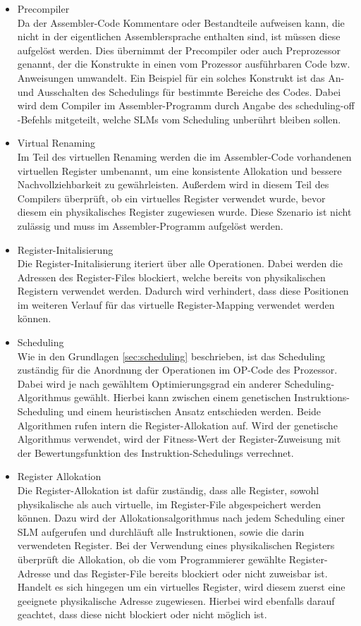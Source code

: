 \begin{itemize}
	\item Precompiler\\
		Da der Assembler-Code Kommentare oder Bestandteile aufweisen kann, die nicht in der eigentlichen Assemblersprache enthalten sind, ist müssen diese aufgelöst werden. Dies übernimmt der Precompiler oder auch Preprozessor genannt, der die Konstrukte in einen vom Prozessor ausführbaren Code bzw. Anweisungen umwandelt. Ein Beispiel für ein solches Konstrukt ist das An- und Ausschalten des Schedulings für bestimmte Bereiche des Codes. Dabei wird dem Compiler im Assembler-Programm durch Angabe des \glqq scheduling-off \grqq-Befehls mitgeteilt, welche SLMs vom Scheduling unberührt bleiben sollen.
	\item Virtual Renaming\\
		Im Teil des virtuellen Renaming werden die im Assembler-Code vorhandenen virtuellen Register umbenannt, um eine konsistente Allokation und bessere Nachvollziehbarkeit zu gewährleisten. Außerdem wird in diesem Teil des Compilers überprüft, ob ein virtuelles Register verwendet wurde, bevor diesem ein physikalisches Register zugewiesen wurde. Diese Szenario ist nicht zulässig und muss im Assembler-Programm aufgelöst werden.
	\item Register-Initalisierung\\
		Die Register-Initalisierung iteriert über alle Operationen. Dabei werden die Adressen des Register-Files blockiert, welche bereits von physikalischen Registern verwendet werden. Dadurch wird verhindert, dass diese Positionen im weiteren Verlauf für das virtuelle Register-Mapping verwendet werden können.
	\item Scheduling\\
		Wie in den Grundlagen \ref{sec:scheduling} beschrieben, ist das Scheduling zuständig für die Anordnung der Operationen im OP-Code des Prozessor. Dabei wird je nach gewähltem Optimierungsgrad ein anderer Scheduling-Algorithmus gewählt. Hierbei kann zwischen einem genetischen Instruktions-Scheduling und einem heuristischen Ansatz entschieden werden. Beide Algorithmen rufen intern die Register-Allokation auf. Wird der genetische Algorithmus verwendet, wird der Fitness-Wert der Register-Zuweisung mit der Bewertungsfunktion des Instruktion-Schedulings verrechnet.
	\item Register Allokation\\
		Die Register-Allokation ist dafür zuständig, dass alle Register, sowohl physikalische als auch virtuelle, im Register-File abgespeichert werden können. Dazu wird der Allokationsalgorithmus nach jedem Scheduling einer SLM aufgerufen und durchläuft alle Instruktionen, sowie die darin verwendeten Register. Bei der Verwendung eines physikalischen Registers überprüft die Allokation, ob die vom Programmierer gewählte Register-Adresse und das Register-File bereits blockiert oder nicht zuweisbar ist. Handelt es sich hingegen um ein virtuelles Register, wird diesem zuerst eine geeignete physikalische Adresse zugewiesen. Hierbei wird ebenfalls darauf geachtet, dass diese nicht blockiert oder nicht möglich ist.

\end{itemize}
